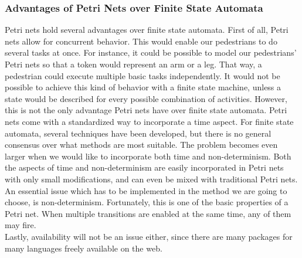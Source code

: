 \documentclass[11pt]{book}
\begin{document}
\subsubsection{Advantages of Petri Nets over Finite State Automata}
Petri nets hold several advantages over finite state automata. First of all, Petri nets allow for concurrent behavior. This would enable our pedestrians to do several tasks at once. For instance, it could be possible to model our pedestrians' Petri nets so that a token would represent an arm or a leg. That way, a pedestrian could execute multiple basic tasks independently. It would not be possible to achieve this kind of behavior with a finite state machine, unless a state would be described for every possible combination of activities.
However, this is not the only advantage Petri nets have over finite state automata. Petri nets come with a standardized way to incorporate a time aspect. For finite state automata, several techniques have been developed, but there is no general consensus over what methods are most suitable. The problem becomes even larger when we would like to incorporate both time and non-determinism. Both the aspects of time and non-determinism are easily incorporated in Petri nets with only small modifications, and can even be mixed with traditional Petri nets.
An essential issue which has to be implemented in the method we are going to choose, is non-determinism. Fortunately, this is one of the basic properties of a Petri net. When multiple transitions are enabled at the same time, any of them may fire.\\
Lastly, availability will not be an issue either, since there are many packages for many languages freely available on the web.
\end{document}
